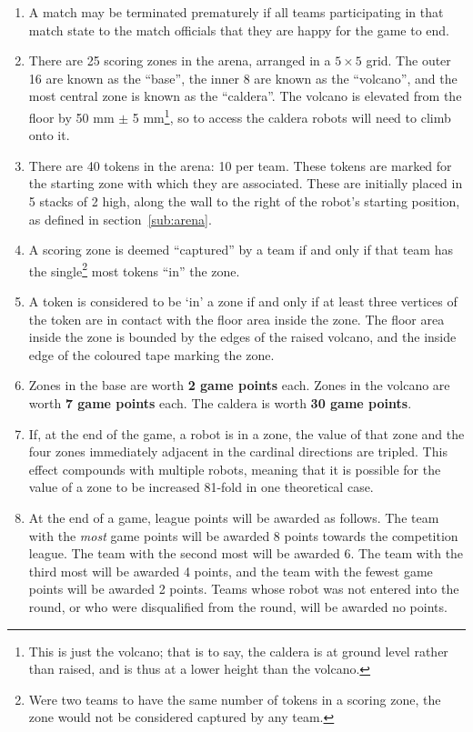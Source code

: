 \begin{enumerate}
\item A match may be terminated prematurely if all teams participating in that match state to the match officials that they are happy for the game to end.

\item There are 25 scoring zones in the arena, arranged in a $5\times5$ grid. The outer 16 are known as the ``base'', the inner 8 are known as the ``volcano'', and the most central zone is known as the ``caldera''. The volcano is elevated from the floor by 50 mm $\pm$ 5 mm\footnote{This is just the volcano; that is to say, the caldera is at ground level rather than raised, and is thus at a lower height than the volcano.}, so to access the caldera robots will need to climb onto it.

\item There are 40 tokens in the arena: 10 per team. These tokens are marked for the starting zone with which they are associated. These are initially placed in 5 stacks of 2 high, along the wall to the right of the robot's starting position, as defined in section~\ref{sub:arena}.

\item A scoring zone is deemed ``captured'' by a team if and only if that team has the single\footnote{Were two teams to have the same number of tokens in a scoring zone, the zone would not be considered captured by any team.} most tokens ``in'' the zone.

\item A token is considered to be `in' a zone if and only if at least three vertices of the token are in contact with the floor area inside the zone. The floor area inside the zone is bounded by the edges of the raised volcano, and the inside edge of the coloured tape marking the zone.

\item Zones in the base are worth \textbf{2 game points} each. Zones in the volcano are worth \textbf{7 game points} each. The caldera is worth \textbf{30 game points}.

\item If, at the end of the game, a robot is in a zone, the value of that zone and the four zones immediately adjacent in the cardinal directions are tripled. This effect compounds with multiple robots, meaning that it is possible for the value of a zone to be increased 81-fold in one theoretical case.  %

\item At the end of a game, league points will be awarded as follows.
      The team with the \emph{most} game points will be awarded 8 points towards the competition league.
      The team with the second most will be awarded 6.
      The team with the third most will be awarded 4 points, and the team with the fewest game points will be awarded 2 points.
      Teams whose robot was not entered into the round, or who were disqualified from the round, will be awarded no points.


\end{enumerate}
